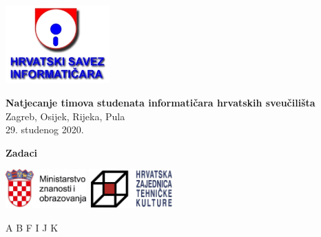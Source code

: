 \documentclass[a4paper]{article}
\begin{document}
\thispagestyle{empty}
\begin{center}
  \includegraphics[height=3cm]{pic/hsin.jpg}
\end{center}
\vspace{1cm}
\begin{center}
  {\Large\textbf{\textsf{Natjecanje timova studenata informatičara hrvatskih sveučilišta}}} \\
  \vspace{.5cm}
  {\large{\textsf{Zagreb, Osijek, Rijeka, Pula}}} \\
  \vspace{.3cm}
  \textsf{29. studenog 2020.}
\end{center}
\vspace{2cm}
\begin{center}
  {\large \textbf{Zadaci}}

  \begin{minipage}{.5\textwidth}
    \renewcommand\contentsname{}
    \tableofcontents
  \end{minipage}
\end{center}
\vspace{5cm}
\begin{center}
  \includegraphics[height=1.5cm]{pic/mzo.jpg}
  \hspace{3cm}
  \includegraphics[height=1.5cm]{pic/hztk.png}
\end{center}
\vspace{\fill}
\clearpage
\setcounter{page}{1}
{A}
{B}
{F}
{I}
{J}
{K}
\end{document}
